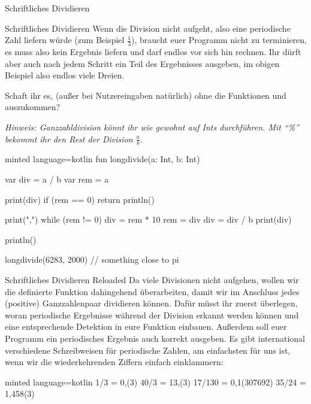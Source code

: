 \begin{task}[points=auto]{Schriftliches Dividieren}
\begin{subtask*}[points=0]{Schriftliches Dividieren }
        Wenn die Division nicht aufgeht, also eine periodische Zahl liefern würde (zum Beispiel $\frac13$), braucht euer Programm nicht zu terminieren, es muss also kein Ergebnis liefern und darf endlos vor sich hin rechnen.
        Ihr dürft aber auch nach jedem Schritt ein Teil des Ergebnisses ausgeben,
        im obigen Beispiel also endlos viele Dreien.

        Schaft ihr es, (außer bei Nutzereingaben natürlich) ohne die Funktionen
             und  auszukommen?

        \textit{Hinweis: Ganzzahldivision könnt ihr wie gewohnt auf Ints durchführen.
            Mit \enquote{\%} bekommt ihr den Rest der Division $\frac{a}{b}$.}

        \begin{solution}
            \begin{codeBlock}[]{minted language=kotlin}
                fun longdivide(a: Int, b: Int) {
                    var div = a / b
                    var rem = a %

                    print(div)
                    if (rem == 0) {
                        return
                        println()
                    }

                    print(",")
                    while (rem != 0) {
                        div = rem * 10
                        rem = div %
                        div = div / b
                        print(div)
                    }

                    println()
                }

                longdivide(6283, 2000) // something close to pi
            \end{codeBlock}
        \end{solution}
    \end{subtask*}
    \begin{subtask*}[points=0]{Schriftliches Dividieren Reloaded }
        Da viele Divisionen nicht aufgehen, wollen wir die definierte Funktion dahingehend überarbeiten, damit wir im Anschluss jedes (positive) Ganzzahlenpaar dividieren können.
        Dafür müsst ihr zuerst überlegen, woran periodische Ergebnisse während der Division erkannt werden können und eine entsprechende Detektion in eure Funktion einbauen.
        Außerdem soll euer Programm ein periodisches Ergebnis auch korrekt ausgeben. Es gibt international verschiedene Schreibweisen für periodische Zahlen, am einfachsten für uns ist, wenn wir die wiederkehrenden Ziffern einfach einklammern:
        \begin{codeBlock}[]{minted language=kotlin}
            1/3 = 0,(3)
            40/3 = 13,(3)
            17/130 = 0,1(307692)
            35/24 = 1,458(3)
        \end{codeBlock}


\end{subtask*}
\end{task}
